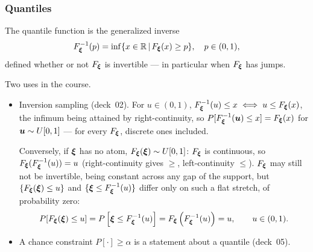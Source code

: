 \documentclass[aspectratio=169]{beamer}
\begin{document}
\begin{frame}
\frametitle{Quantiles}
\small

The {\red quantile function} is the {\red generalized inverse}
\[
F_{{\boldsymbol{\xi}}}^{-1}(p) = \inf \lbrace x \in {\mathbb{R}} \,|\, F_{{\boldsymbol{\xi}}}(x) \geq p \rbrace, \quad p \in (0,1),
\]
defined whether or not $F_{{\boldsymbol{\xi}}}$ is invertible --- in particular when $F_{{\boldsymbol{\xi}}}$ has jumps.

\smallskip

{\blue Two uses in the course.}
\begin{itemize}
\item
{\red Inversion sampling} (deck~02). For $u \in (0,1)$, $F_{{\boldsymbol{\xi}}}^{-1}(u) \leq x \iff u \leq F_{{\boldsymbol{\xi}}}(x)$, the infimum being attained by right-continuity, so $P[F_{{\boldsymbol{\xi}}}^{-1}({\boldsymbol{u}}) \leq x] = F_{{\boldsymbol{\xi}}}(x)$ for ${\boldsymbol{u}} \sim U[0,1]$ --- {\red for every} $F_{{\boldsymbol{\xi}}}$, discrete ones included.

Conversely, if ${\boldsymbol{\xi}}$ has no atom, $F_{{\boldsymbol{\xi}}}({\boldsymbol{\xi}}) \sim U[0,1]$: $F_{{\boldsymbol{\xi}}}$ is continuous, so $F_{{\boldsymbol{\xi}}}(F_{{\boldsymbol{\xi}}}^{-1}(u)) = u$ (right-continuity gives $\geq$, left-continuity $\leq$). $F_{{\boldsymbol{\xi}}}$ may still not be invertible, being constant across any gap of the support, but $\lbrace F_{{\boldsymbol{\xi}}}({\boldsymbol{\xi}}) \leq u \rbrace$ and $\lbrace {\boldsymbol{\xi}} \leq F_{{\boldsymbol{\xi}}}^{-1}(u) \rbrace$ differ only on such a flat stretch, of probability zero:
\[
P[F_{{\boldsymbol{\xi}}}({\boldsymbol{\xi}}) \leq u] = P\left[{\boldsymbol{\xi}} \leq F_{{\boldsymbol{\xi}}}^{-1}(u)\right] = F_{{\boldsymbol{\xi}}}\left(F_{{\boldsymbol{\xi}}}^{-1}(u)\right) = u, \qquad u \in (0,1).
\]
\item
A chance constraint $P[\cdot] \geq \alpha$ is a statement about a quantile (deck~05).
\end{itemize}

\end{frame}
\end{document}
